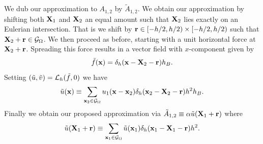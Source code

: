 We dub our approximation to $A_{1,2}$ by $\tilde{A}_{1,2}$.
We obtain our approximation by shifting both $\mathbf{X}_1$ and $\mathbf{X}_2$ an equal amount such that $\mathbf{X}_2$ lies exactly on an Eulerian intersection. That is we shift by $\mathbf{r}\in[-h/2,h/2)\times[-h/2,h/2)$ such that $\mathbf{X}_2 +\mathbf{r}\in\mathcal{G}_\Omega$. We then proceed as before, starting with a unit horizontal force at $\mathbf{X}_2+\mathbf{r}$. Spreading this force results in a vector field with $x$-component given by
\begin{equation}
\tilde{f}(\mathbf{x}) = \delta_h(\mathbf{x} - \mathbf{X}_2 - \mathbf{r})h_B.
\end{equation}
Setting $(\tilde{u},\tilde{v})=\mathcal{L}_h(\tilde{f},0)$ we have
\begin{equation}
\tilde{u}(\mathbf{x}) \equiv
\sum_{\mathbf{x}_2\in\mathcal{G}_\Omega}
u_1(\mathbf{x} - \mathbf{x}_2)\delta_h(\mathbf{x}_2 - \mathbf{X}_2 - \mathbf{r})h^2h_B. \label{meq:utx}
\end{equation}
Finally we obtain our proposed approximation via $\tilde{A}_{1,2} \equiv \alpha \tilde{u}(\mathbf{X}_1+\mathbf{r})$ where
\begin{equation}
\tilde{u}(\mathbf{X}_1+\mathbf{r}) \equiv
\sum_{\mathbf{x}_1\in\mathcal{G}_\Omega}
\tilde{u}(\mathbf{x}_1)\delta_h(\mathbf{x}_1 - \mathbf{X}_1 - \mathbf{r})h^2. \label{meq:uts}
\end{equation}

